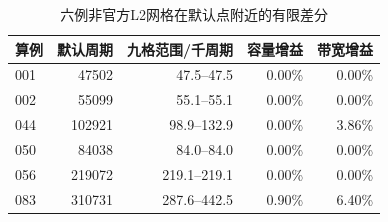 \begin{table}[htbp]\centering
\caption{六例非官方L2网格在默认点附近的有限差分}\label{tab:q3-grid-deep}
\small\begin{tabular}{lrrrr}\toprule
算例 & 默认周期 & 九格范围/千周期 & 容量增益 & 带宽增益 \\ \midrule
001 & 47502 & 47.5--47.5 & 0.00\% & 0.00\% \\
002 & 55099 & 55.1--55.1 & 0.00\% & 0.00\% \\
044 & 102921 & 98.9--132.9 & 0.00\% & 3.86\% \\
050 & 84038 & 84.0--84.0 & 0.00\% & 0.00\% \\
056 & 219072 & 219.1--219.1 & 0.00\% & 0.00\% \\
083 & 310731 & 287.6--442.5 & 0.90\% & 6.40\% \\
\bottomrule\end{tabular}\end{table}
